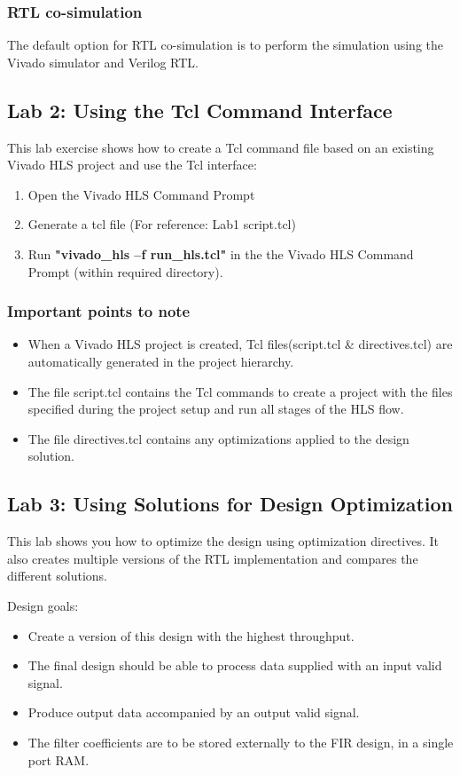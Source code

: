 \subsubsection{RTL co-simulation}
The default option for RTL co-simulation is to perform the simulation using the Vivado simulator and Verilog RTL. 

\subsection{Lab 2: Using the Tcl Command Interface}
This lab exercise shows how to create a Tcl command file based on an existing Vivado HLS project and use the Tcl interface:

\begin{enumerate}[label=Step \arabic*:]
    \item Open the Vivado HLS Command Prompt
    \item Generate a tcl file (For reference: Lab1 script.tcl)
    \item Run {\bf "vivado\_hls –f run\_hls.tcl"} in the the Vivado HLS Command Prompt (within required directory).
\end{enumerate}

\subsubsection{Important points to note}
\begin{itemize}
    \item When a Vivado HLS project is created, Tcl files(script.tcl \& directives.tcl) are automatically generated in the project hierarchy.
    \item The file script.tcl contains the Tcl commands to create a project with the files specified during the project setup and run all stages of the HLS flow.
    \item The file directives.tcl contains any optimizations applied to the design solution.
\end{itemize}
 
\subsection{Lab 3: Using Solutions for Design Optimization}
This lab shows you how to optimize the design using optimization directives. It also creates multiple versions of the RTL implementation and compares the different solutions.

\par Design goals:
\begin{itemize}
    \item Create a version of this design with the highest throughput.
    \item The final design should be able to process data supplied with an input valid signal.
    \item Produce output data accompanied by an output valid signal.
    \item The filter coefficients are to be stored externally to the FIR design, in a single port RAM.
\end{itemize} 

